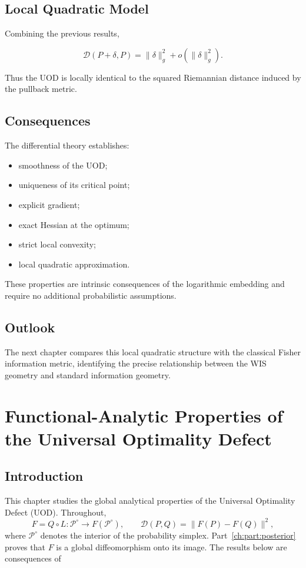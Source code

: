 \section{Local Quadratic Model}\label{ch:sec:local-quadratic-model}

Combining the previous results,

\[
\boxed{
\mathcal D(P+\delta,P)
=
\|\delta\|_g^2
+
o(\|\delta\|_g^2).
}
\]

Thus the UOD is locally identical to the squared Riemannian distance
induced by the pullback metric.

\section{Consequences}\label{ch:sec:consequences}

The differential theory establishes:
\begin{itemize}
\item smoothness of the UOD;
\item uniqueness of its critical point;
\item explicit gradient;
\item exact Hessian at the optimum;
\item strict local convexity;
\item local quadratic approximation.
\end{itemize}

These properties are intrinsic consequences of the logarithmic embedding
and require no additional probabilistic assumptions.

\section{Outlook}\label{ch:sec:outlook-analytic_uod}

The next chapter compares this local quadratic structure with the
classical Fisher information metric, identifying the precise
relationship between the WIS geometry and standard information geometry.


\chapter[Functional-Analytic Properties]{Functional-Analytic Properties of the Universal Optimality Defect}\label{ch:sec:functional-analytic-properties-of-the-universal-optimal}
\section{Introduction}\label{ch:sec:introduction-analytic_uod-4}
This chapter studies the global analytical properties of the Universal
Optimality Defect (UOD). Throughout,
\[
F=Q\circ L:\mathcal P^\circ\rightarrow F(\mathcal P^\circ),
\qquad \mathcal D(P,Q)=\|F(P)-F(Q)\|^2,
\]
where \(\mathcal P^\circ\) denotes the interior of the
probability simplex. Part~\ref{ch:part:posterior} proves that \(F\) is a global
diffeomorphism onto its image. The results below are consequences of
